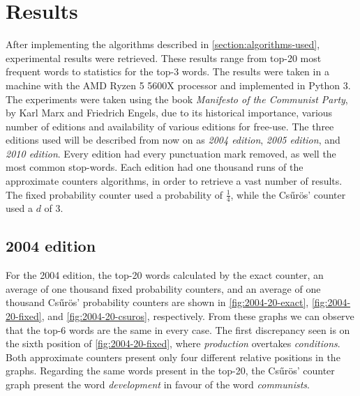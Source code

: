 \section{Results}\label{section:results}
After implementing the algorithms described in \autoref{section:algorithms-used}, experimental results were retrieved.
These results range from top-20 most frequent words to statistics for the top-3 words.
The results were taken in a machine with the AMD Ryzen 5 5600X processor and implemented in Python 3.
The experiments were taken using the book \emph{Manifesto of the Communist Party}, by Karl Marx and Friedrich Engels, due to its historical importance, various number of editions and availability of various editions for free-use. %
The three editions used will be described from now on as \emph{2004 edition}, \emph{2005 edition}, and \emph{2010 edition}. 
Every edition had every punctuation mark removed, as well the most common stop-words. %
Each edition had one thousand runs of the approximate counters algorithms, in order to retrieve a vast number of results.
The fixed probability counter used a probability of $\frac{1}{4}$, while the Csűrös' counter used a $d$ of $3$.

\subsection{2004 edition}

For the 2004 edition, the top-20 words calculated by the exact counter, an average of one thousand fixed probability counters, and an average of one thousand Csűrös' probability counters are shown in \autoref{fig:2004-20-exact}, \autoref{fig:2004-20-fixed}, and \autoref{fig:2004-20-csuros}, respectively.
From these graphs we can observe that the top-6 words are the same in every case. 
The first discrepancy seen is on the sixth position of \autoref{fig:2004-20-fixed}, where \emph{production} overtakes \emph{conditions}.
Both approximate counters present only four different relative positions in the graphs.
Regarding the same words present in the top-20, the Csűrös' counter graph present the word \emph{development} in favour of the word \emph{communists}.


